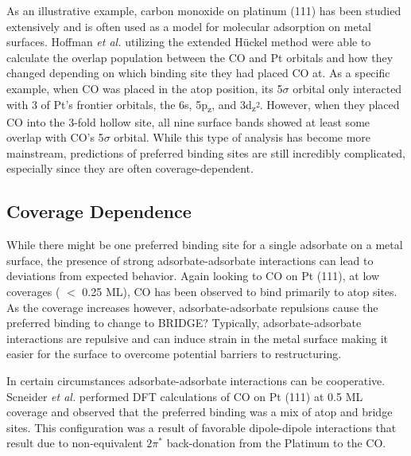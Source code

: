 As an illustrative example, carbon monoxide on platinum (111) has been studied
extensively\citep{Ertl:1977, Kelemen:1979, Yeo:1997, Wong:1991ta, Feibelman:2001, Deshlahra:2009wu,
Deshlahra:2012aa} and is often used as a model for molecular adsorption on
metal surfaces.  Hoffman {\em et al.} utilizing the extended H\"uckel
method\citep{Wong:1991ta} were able to calculate the overlap population between
the CO and Pt orbitals and how they changed depending on which binding site
they had placed CO at. As a specific example, when CO was placed in the atop
position, its 5$\sigma$ orbital only interacted with 3 of Pt's frontier
orbitals, the 6s, 5p\textsubscript{z}, and
3d\textsubscript{z\textsuperscript{2}}. However, when they placed CO into the
3-fold hollow site, all nine surface bands showed at least some overlap with
CO's 5$\sigma$ orbital. While this type of analysis has become more mainstream,
predictions of preferred binding sites are still incredibly complicated,
especially since they are often coverage-dependent.

\subsection{Coverage Dependence}
While there might be one preferred binding site for a single adsorbate on a
metal surface, the presence of strong adsorbate-adsorbate interactions can lead
to deviations from expected behavior. Again looking to CO on Pt (111), at low
coverages ( $<$ 0.25 ML), CO has been observed to bind primarily to atop sites.
As the coverage increases however, adsorbate-adsorbate repulsions cause the
preferred binding to change to BRIDGE? Typically, adsorbate-adsorbate
interactions are repulsive and can induce strain in the metal surface
 making it easier for the surface to overcome potential barriers to
restructuring.

In certain circumstances adsorbate-adsorbate interactions can be cooperative.
Scneider {\em et al.} performed DFT calculations of CO on Pt (111) at 0.5 ML
coverage and observed that the preferred binding was a mix of atop and bridge
sites.\citep{Deshlahra:2012aa} This configuration was a result of favorable
dipole-dipole interactions that result due to non-equivalent $2\pi^*$
back-donation from the Platinum to the CO.


